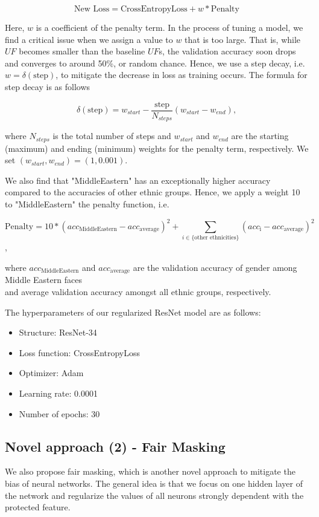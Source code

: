 \begin{equation}
\mbox{New Loss} = \mbox{CrossEntropyLoss} + w*\mbox{Penalty} 
\end{equation}

Here, $w$ is a coefficient of the penalty term. In the process of tuning a model, we find a critical issue when we assign a value to $w$ that is too large.  That is, while $UF$ becomes smaller than the baseline $UF$s, the validation accuracy soon drops and converges to around 50\%, or random chance.  Hence, we use a step decay, i.e. $w = \delta(\mbox{step})$, to mitigate the decrease in loss as training occurs. The formula for step decay is as follows

\begin{equation}
\delta(\mbox{step}) = w_{start} - \frac{\mbox{step}}{N_{steps}}(w_{start} - w_{end}),
\end{equation}

where $N_{steps}$ is the total number of steps and $w_{start}$ and $w_{end}$ are the starting (maximum) and ending (minimum) weights for the penalty term, respectively. We set $(w_{start}, w_{end}) = (1, 0.001)$.

We also find that "MiddleEastern" has an exceptionally higher accuracy compared to the accuracies of other ethnic groups.  Hence, we apply a weight 10 to "MiddleEastern" the penalty function, i.e.

$$
{\mbox{Penalty} = 10*(acc_{\mbox{MiddleEastern}} - acc_{\mbox{average}})^2 + \sum_{i\in \{\mbox{other ethnicities}\}} (acc_{\mbox{i}} - acc_{\mbox{average}})^2}
$$,

where $acc_{\mbox{MiddleEastern}}$ and $acc_{\mbox{average}}$ are the validation accuracy of gender among Middle Eastern faces
\\
and average validation accuracy amongst all ethnic groups, respectively. 

The hyperparameters of our regularized ResNet model are as follows:
\begin{itemize}
    \item Structure: ResNet-34
    \item Loss function: CrossEntropyLoss
    \item Optimizer: Adam
    \item Learning rate: 0.0001
    \item Number of epochs: 30
\end{itemize}

\subsection{Novel approach (2) - Fair Masking}
We also propose fair masking, which is another novel approach to mitigate the bias of neural networks. The general idea is that we focus on one hidden layer of the network and regularize the values of all neurons strongly dependent with the protected feature. 

